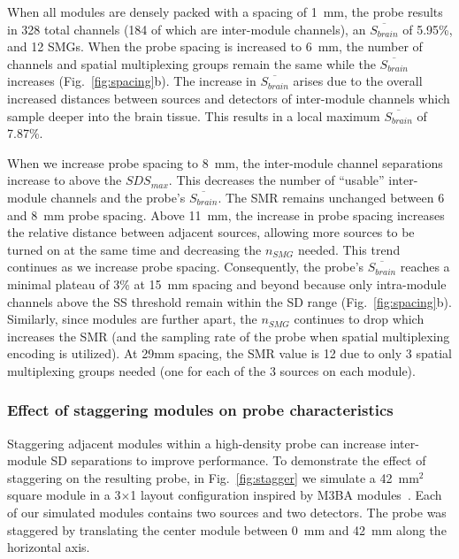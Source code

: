 When all modules are densely packed with a spacing of 1~mm, the probe results in 328 total channels (184 of which are inter-module channels), an $\overline{S_{brain}}$ of 5.95\%, and 12 SMGs. When the probe spacing is increased to 6~mm, the number of channels and spatial multiplexing groups remain the same while the $\overline{S_{brain}}$ increases (Fig.~\ref{fig:spacing}b). The increase in $\overline{S_{brain}}$ arises due to the overall increased distances between sources and detectors of inter-module channels which sample deeper into the brain tissue. This results in a local maximum $\overline{S_{brain}}$ of 7.87\%. 

When we increase probe spacing to 8~mm, the inter-module channel separations increase to above the $SDS_{max}$. This decreases the number of ``usable'' inter-module channels and the probe's $\overline{S_{brain}}$. The SMR remains unchanged between 6 and 8~mm probe spacing. Above 11~mm, the increase in probe spacing increases the relative distance between adjacent sources, allowing more sources to be turned on at the same time and decreasing the $n_{SMG}$ needed. This trend continues as we increase probe spacing. Consequently, the probe's $\overline{S_{brain}}$ reaches a minimal plateau of 3\% at 15~mm spacing and beyond because only intra-module channels above the SS threshold remain within the \ac{SD} range (Fig.~\ref{fig:spacing}b). Similarly, since modules are further apart, the $n_{SMG}$ continues to drop which increases the SMR (and the sampling rate of the probe when spatial multiplexing encoding is utilized). At 29mm spacing, the SMR value is 12 due to only 3 spatial multiplexing groups needed (one for each of the 3 sources on each module).

\subsubsection{Effect of staggering modules on probe characteristics}
Staggering adjacent modules within a high-density probe can increase inter-module \ac{SD} separations to improve performance. To demonstrate the effect of staggering on the resulting probe, in Fig.~\ref{fig:stagger} we simulate a 42~$\textrm{mm}^2$ square module in a 3$\times$1 layout configuration inspired by M3BA modules~\cite{Bci2017}. Each of our simulated modules contains two sources and two detectors. The probe was staggered by translating the center module between 0~mm and 42~mm along the horizontal axis.

